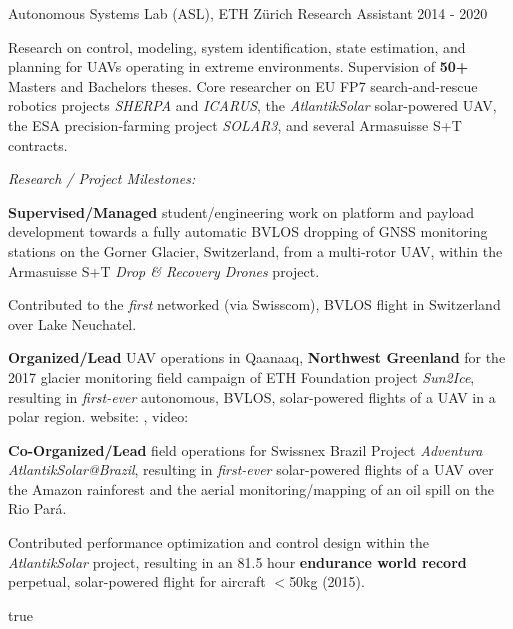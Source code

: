 \begin{cventries}
\cvexpentry
  	{Autonomous Systems Lab (ASL), ETH Z\"{u}rich} %
  	{Research Assistant} %
    {} %
    {2014 - 2020} %
    {
      \begin{cvitems} %
      	\item Research on control, modeling, system identification, state estimation, and planning for UAVs operating in extreme environments. Supervision of \textbf{50+} Masters and Bachelors theses. Core researcher on EU FP7 search-and-rescue robotics projects \emph{SHERPA} and \emph{ICARUS}, the \emph{AtlantikSolar} solar-powered UAV, the ESA precision-farming project \emph{SOLAR3}, and several Armasuisse S+T contracts.
		\item[] \hspace{-1.2em} \emph{Research / Project Milestones:}
		\item \textbf{Supervised/Managed} student/engineering work on platform and payload development towards a fully automatic BVLOS dropping of GNSS monitoring stations on the Gorner Glacier, Switzerland, from a multi-rotor UAV, within the Armasuisse S+T \emph{Drop \& Recovery Drones} project. 
		\item Contributed to the \emph{first} networked (via Swisscom), BVLOS flight in Switzerland over Lake Neuchatel. 
		\item \textbf{Organized/Lead} UAV operations in Qaanaaq, \textbf{Northwest Greenland} for the 2017 glacier monitoring field campaign of ETH Foundation project \emph{Sun2Ice}, resulting in \emph{first-ever} autonomous, BVLOS, solar-powered flights of a UAV in a polar region. website: , video: 
		\item \textbf{Co-Organized/Lead} field operations for Swissnex Brazil Project \emph{Adventura AtlantikSolar@Brazil}, resulting in \emph{first-ever} solar-powered flights of a UAV over the Amazon rainforest and the aerial monitoring/mapping of an oil spill on the Rio Par\'{a}. 
		\item Contributed performance optimization and control design within the \emph{AtlantikSolar} project, resulting in an 81.5 hour \textbf{endurance world record} perpetual, solar-powered flight for aircraft $<$50kg (2015). 
      \end{cvitems}
    } %
    {} %
    {true}
    {}
    

\end{cventries}

